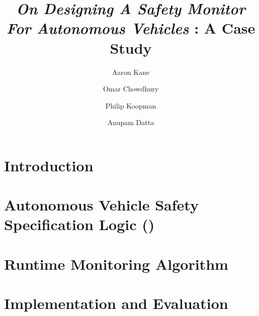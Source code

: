 \documentclass[envcountsame]{llncs}
\begin{document}
%
\frontmatter          %
%
\pagestyle{headings}  %
\mainmatter              %
\title{\emph{On Designing A Safety Monitor For Autonomous Vehicles} : A Case Study}

\author{
Aaron Kane \and Omar Chowdhury \and Philip Koopman \and Anupam Datta}
%
%
%

\maketitle              %



\begin{abstract}
\end{abstract}



\section{Introduction}
\label{section:introduction}




\section{Autonomous Vehicle Safety Specification Logic (\planguage)}
\label{section:specificationLanguage}



\section{Runtime Monitoring Algorithm}
\label{section:algorithm}


\section{Implementation and Evaluation}
\label{section:implementation}

\end{document}
